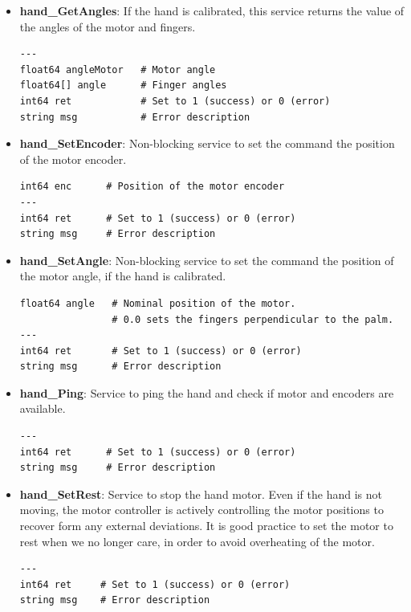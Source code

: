 \documentclass[letterpaper,notitlepage,11pt]{article}
\begin{document}
\begin{itemize}
\item \textbf{hand\_GetAngles}: If the hand is calibrated, this
  service returns the value of the angles of the motor and fingers.

\begin{verbatim}
---
float64 angleMotor   # Motor angle
float64[] angle      # Finger angles
int64 ret            # Set to 1 (success) or 0 (error)
string msg           # Error description
\end{verbatim}

\item \textbf{hand\_SetEncoder}: Non-blocking service to set the command the
  position of the motor encoder.

\begin{verbatim}
int64 enc      # Position of the motor encoder
---
int64 ret      # Set to 1 (success) or 0 (error)
string msg     # Error description
\end{verbatim}

\item \textbf{hand\_SetAngle}: Non-blocking service to set the command the
  position of the motor angle, if the hand is calibrated.

\begin{verbatim}
float64 angle   # Nominal position of the motor.
                # 0.0 sets the fingers perpendicular to the palm.
---
int64 ret       # Set to 1 (success) or 0 (error)
string msg      # Error description
\end{verbatim}

\item \textbf{hand\_Ping}: Service to ping the hand and check if motor
  and encoders are available.

\begin{verbatim}
---
int64 ret      # Set to 1 (success) or 0 (error)
string msg     # Error description
\end{verbatim}

\item \textbf{hand\_SetRest}: Service to stop the hand motor. Even if
  the hand is not moving, the motor controller is actively controlling
  the motor positions to recover form any external deviations. It is
  good practice to set the motor to rest when we no longer care, in
  order to avoid overheating of the motor.

\begin{verbatim}
---
int64 ret     # Set to 1 (success) or 0 (error)
string msg    # Error description
\end{verbatim}


\end{itemize}
\end{document}
